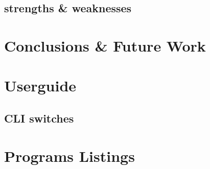 \documentclass[11pt]{report}
\begin{document}
\section{strengths \& weaknesses}

\chapter{Conclusions \& Future Work}

\chapter{Userguide}
\section{CLI switches}

\chapter{Programs Listings}
\end{document}
